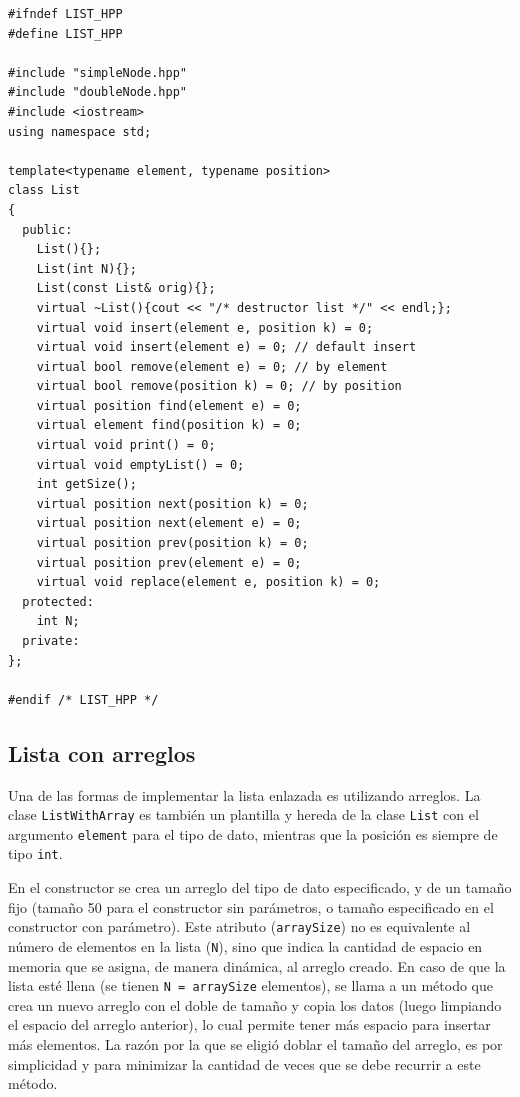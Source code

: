 \begin{verbatim}
#ifndef LIST_HPP
#define LIST_HPP

#include "simpleNode.hpp"
#include "doubleNode.hpp"
#include <iostream>
using namespace std;

template<typename element, typename position>
class List
{
  public:
    List(){};
    List(int N){};
    List(const List& orig){};
    virtual ~List(){cout << "/* destructor list */" << endl;};
    virtual void insert(element e, position k) = 0;
    virtual void insert(element e) = 0; // default insert
    virtual bool remove(element e) = 0; // by element
    virtual bool remove(position k) = 0; // by position
    virtual position find(element e) = 0; 
    virtual element find(position k) = 0;
    virtual void print() = 0;
    virtual void emptyList() = 0;
    int getSize();
    virtual position next(position k) = 0;
    virtual position next(element e) = 0;
    virtual position prev(position k) = 0;
    virtual position prev(element e) = 0;
    virtual void replace(element e, position k) = 0;
  protected:
    int N;
  private:
};

#endif /* LIST_HPP */
\end{verbatim}


\subsection{Lista con arreglos}
Una de las formas de implementar la lista enlazada es utilizando arreglos. La clase \texttt{ListWithArray} es también un plantilla y hereda de la clase \texttt{List} con el argumento \texttt{element} para el tipo de dato, mientras que la posición es siempre de tipo \texttt{int}. 

En el constructor se crea un arreglo del tipo de dato especificado, y de un tamaño fijo (tamaño 50 para el constructor sin parámetros, o tamaño especificado en el constructor con parámetro). Este atributo (\texttt{arraySize}) no es equivalente al número de elementos en la lista (\texttt{N}), sino que indica la cantidad de espacio en memoria que se asigna, de manera dinámica, al arreglo creado. En caso de que la lista esté llena (se tienen \texttt{N = arraySize} elementos), se llama a un método que crea un nuevo arreglo con el doble de tamaño y copia los datos (luego limpiando el espacio del arreglo anterior), lo cual permite tener más espacio para insertar más elementos. La razón por la que se eligió doblar el tamaño del arreglo, es por simplicidad y para minimizar la cantidad de veces que se debe recurrir a este método.

